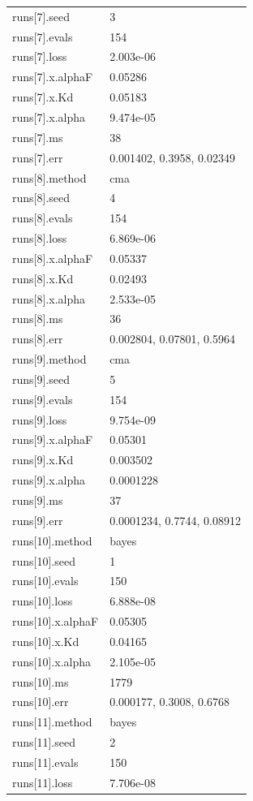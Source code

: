 {\begin{longtable}{p{}p{}}
{}runs[7].seed & 3\\
{}runs[7].evals & 154\\
{}runs[7].loss & 2.003e-06\\
{}runs[7].x.alphaF & 0.05286\\
{}runs[7].x.Kd & 0.05183\\
{}runs[7].x.alpha & 9.474e-05\\
{}runs[7].ms & 38\\
{}runs[7].err & 0.001402, 0.3958, 0.02349\\
{}runs[8].method & cma\\
{}runs[8].seed & 4\\
{}runs[8].evals & 154\\
{}runs[8].loss & 6.869e-06\\
{}runs[8].x.alphaF & 0.05337\\
{}runs[8].x.Kd & 0.02493\\
{}runs[8].x.alpha & 2.533e-05\\
{}runs[8].ms & 36\\
{}runs[8].err & 0.002804, 0.07801, 0.5964\\
{}runs[9].method & cma\\
{}runs[9].seed & 5\\
{}runs[9].evals & 154\\
{}runs[9].loss & 9.754e-09\\
{}runs[9].x.alphaF & 0.05301\\
{}runs[9].x.Kd & 0.003502\\
{}runs[9].x.alpha & 0.0001228\\
{}runs[9].ms & 37\\
{}runs[9].err & 0.0001234, 0.7744, 0.08912\\
{}runs[10].method & bayes\\
{}runs[10].seed & 1\\
{}runs[10].evals & 150\\
{}runs[10].loss & 6.888e-08\\
{}runs[10].x.alphaF & 0.05305\\
{}runs[10].x.Kd & 0.04165\\
{}runs[10].x.alpha & 2.105e-05\\
{}runs[10].ms & 1779\\
{}runs[10].err & 0.000177, 0.3008, 0.6768\\
{}runs[11].method & bayes\\
{}runs[11].seed & 2\\
{}runs[11].evals & 150\\
{}runs[11].loss & 7.706e-08\\

\end{longtable}}
